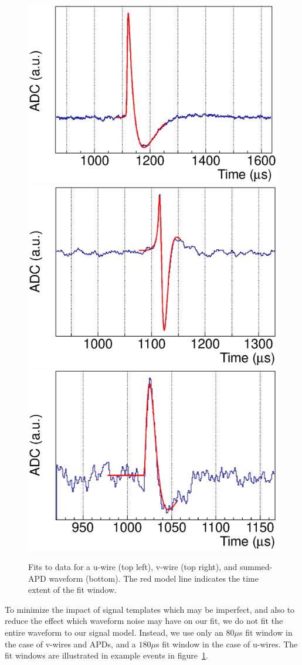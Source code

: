 \begin{figure}
\begin{center}
\includegraphics[keepaspectratio=true,width=.49\textwidth]{U_Wire_Fit.eps}
\includegraphics[keepaspectratio=true,width=.49\textwidth]{V_Wire_Fit.eps}
\includegraphics[keepaspectratio=true,width=.49\textwidth]{APD_Sum_Fit.eps}
\end{center}
\renewcommand{\baselinestretch}{1}
\small\normalsize
\begin{quote}
\caption{Fits to data for a u-wire (top left), v-wire (top right), and summed-APD waveform (bottom).  The red model line indicates the time extent of the fit window.~\cite{ReconstructionDocument}}
\label{fig:ReconExampleFits}
\end{quote}
\end{figure}
\renewcommand{\baselinestretch}{2}
\small\normalsize

To minimize the impact of signal templates which may be imperfect, and also to reduce the effect which waveform noise may have on our fit, we do not fit the entire waveform to our signal model.  Instead, we use only an $80 \mu$s fit window in the case of v-wires and APDs, and a $180 \mu$s fit window in the case of u-wires.  The fit windows are illustrated in example events in figure~\ref{fig:ReconExampleFits}.

